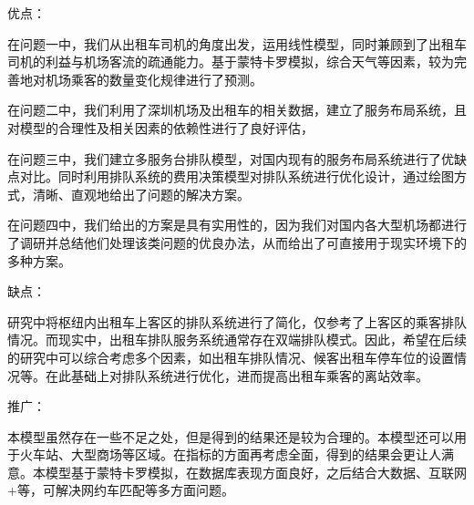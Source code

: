 优点：

在问题一中，我们从出租车司机的角度出发，运用线性模型，同时兼顾到了出租车司机的利益与机场客流的疏通能力。基于蒙特卡罗模拟，综合天气等因素，较为完善地对机场乘客的数量变化规律进行了预测。

在问题二中，我们利用了深圳机场及出租车的相关数据，建立了服务布局系统，且对模型的合理性及相关因素的依赖性进行了良好评估，

在问题三中，我们建立多服务台排队模型，对国内现有的服务布局系统进行了优缺点对比。同时利用排队系统的费用决策模型对排队系统进行优化设计，通过绘图方式，清晰、直观地给出了问题的解决方案。

在问题四中，我们给出的方案是具有实用性的，因为我们对国内各大型机场都进行了调研并总结他们处理该类问题的优良办法，从而给出了可直接用于现实环境下的多种方案。

缺点：

研究中将枢纽内出租车上客区的排队系统进行了简化，仅参考了上客区的乘客排队情况。而现实中，出租车排队服务系统通常存在双端排队模式。因此，希望在后续的研究中可以综合考虑多个因素，如出租车排队情况、候客出租车停车位的设置情况等。在此基础上对排队系统进行优化，进而提高出租车乘客的离站效率。


推广：

本模型虽然存在一些不足之处，但是得到的结果还是较为合理的。本模型还可以用于火车站、大型商场等区域。在指标的方面再考虑全面，得到的结果会更让人满意。本模型基于蒙特卡罗模拟，在数据库表现方面良好，之后结合大数据、互联网+等，可解决网约车匹配等多方面问题。
